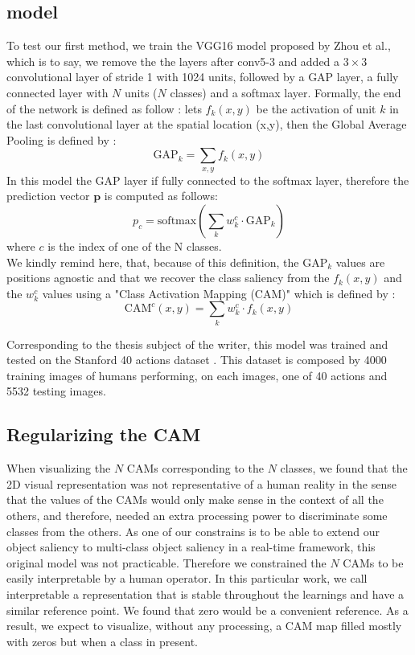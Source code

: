 \documentclass[12pt, letterpaper, twoside]{article}
\begin{document}
	\subsection{model} 
	\label{sub:model}
		To test our first method, we train the VGG16 \cite{simonyan2014very} model proposed by Zhou et al.\cite{zhou2016learning}, which is to say, we remove the the layers after conv5-3 and added a $3\times3$ convolutional layer of stride 1 with 1024 units, followed by a GAP layer, a fully connected layer with $N$ units ($N$ classes) and a softmax layer.
		Formally, the end of the network is defined as follow : lets $f_k(x,y)$ be the activation of unit $k$ in the last convolutional layer at the spatial location (x,y), then the Global Average Pooling is defined by :
		\begin{equation}
			\textrm{GAP}_k = \sum_{x,y} f_k(x,y)
		\end{equation}
		In this model the GAP layer if fully connected to the softmax layer, therefore the prediction vector $\mathbf{p}$ is computed as follows:
		\begin{equation}
			p_c = \textrm{softmax}\left(\sum_{k} w^c_k \cdot \textrm{GAP}_k\right)
		\end{equation}
		where $c$ is the index of one of the N classes. \\
		We kindly remind here, that, because of this definition, the $\textrm{GAP}_k$ values are positions agnostic and that we recover the class saliency from the $f_k(x,y)$ and the $w^c_k$ values using a "Class Activation Mapping (CAM)" which is defined by : 
		\begin{equation}
			\textrm{CAM}^c(x,y) = \sum_k w^c_k \cdot f_k(x,y)
		\end{equation}


		Corresponding to the thesis subject of the writer, this model was trained and tested on the Stanford 40 actions dataset \cite{yao2011human}. This dataset is composed by 4000 training images of humans performing, on each images, one of 40 actions and 5532 testing images.
		
	

	\subsection{Regularizing the CAM}
	\label{sub:regularizing_the_cam}
		When visualizing the $N$ CAMs corresponding to the $N$ classes, we found that the 2D visual representation was not representative of a human reality in the sense that the values of the CAMs would only make sense in the context of all the others, and therefore, needed an extra processing power to discriminate some classes from the others. As one of our constrains is to be able to extend our object saliency to multi-class object saliency in a real-time framework, this original model was not practicable. Therefore we constrained the $N$ CAMs to be easily interpretable by a human operator. In this particular work, we call interpretable a representation that is stable throughout the learnings and have a similar reference point. We found that zero would be a convenient reference. As a result, we expect to visualize, without any processing, a CAM map filled mostly with zeros but when a class in present.
\end{document}
